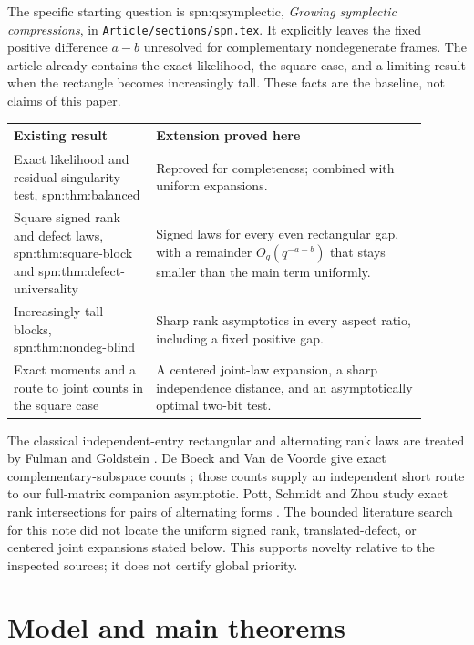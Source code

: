 \documentclass[11pt]{article}
\theoremstyle{definition}
\newcommand{\srcid}[1]{{\footnotesize\ttfamily #1}}
\begin{document}
The specific starting question is \srcid{spn:q:symplectic},
\emph{Growing symplectic compressions}, in \texttt{Article/sections/spn.tex}.
It explicitly leaves the fixed positive difference \(a-b\) unresolved for
complementary nondegenerate frames. The article already contains the exact
likelihood, the square case, and a limiting result when the rectangle
becomes increasingly tall. These facts are the baseline, not claims of this paper.

\begin{center}
\small
\begin{tabular}{>{\raggedright\arraybackslash}p{0.31\linewidth}>{\raggedright\arraybackslash}p{0.59\linewidth}}
\toprule
Existing result & Extension proved here\\
\midrule
Exact likelihood and residual-singularity test,
\srcid{spn:thm:balanced}
& Reproved for completeness; combined with uniform expansions.\\[3pt]
Square signed rank and defect laws,
\srcid{spn:thm:square-block} and
\srcid{spn:thm:defect-universality}
& Signed laws for every even rectangular gap, with a remainder
\(O_q(q^{-a-b})\) that stays smaller than the main term uniformly.\\[3pt]
Increasingly tall blocks,
\srcid{spn:thm:nondeg-blind}
& Sharp rank asymptotics in every aspect ratio, including a fixed positive gap.\\[3pt]
Exact moments and a route to joint counts in the square case
& A centered joint-law expansion, a sharp independence distance,
and an asymptotically optimal two-bit test.\\
\bottomrule
\end{tabular}
\end{center}

The classical independent-entry rectangular and alternating rank laws are
treated by Fulman and Goldstein \cite{FG}. De Boeck and Van de Voorde give
exact complementary-subspace counts \cite{DBV}; those counts supply an
independent short route to our full-matrix companion asymptotic.
Pott, Schmidt and Zhou study exact rank intersections for pairs of
alternating forms \cite{PSZ}. The bounded literature search for this note
did not locate the uniform signed rank, translated-defect, or centered
joint expansions stated below. This supports novelty relative to the
inspected sources; it does not certify global priority.

\section{Model and main theorems}\label{sec:main}
\end{document}
